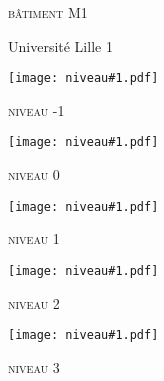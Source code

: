 \documentclass{article}
\newcommand{\niveau}[1]{
\clearpage
\begin{center}
  \texttt{[image: niveau\#1.pdf]}
  \par\vspace{1cm}
  {\Huge \textsc{niveau #1}}
\end{center}
}
\begin{document}
\begin{center}
\vspace*{\fill}
{\Huge \textsc{b\^atiment M1}}

\vspace{1cm}
{\Large Universit\'e Lille 1}
\vspace*{\fill}
\end{center}

\niveau{-1}
\niveau{0}
\niveau{1}
\niveau{2}
\niveau{3}
\end{document}
